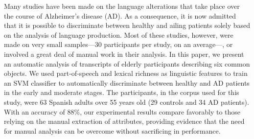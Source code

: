 Many studies have been made on the language alterations that take place over the course of Alzheimer's disease (AD). As a consequence, it is now admitted that it is possible to discriminate between healthy and ailing patients solely based on the analysis of language production. Most of these studies, however, were made on very small samples—30 participants per study, on an average—, or involved a great deal of manual work in their analysis. In this paper, we present an automatic analysis of transcripts of elderly participants describing six common objects. We used part-of-speech and lexical richness as linguistic features to train an SVM classifier to automatically discriminate between healthy and AD patients in the early and moderate stages. The participants, in the corpus used for this study, were 63 Spanish adults over 55 years old (29 controls and 34 AD patients). With an accuracy of 88\%, our experimental results compare favorably to those relying on the manual extraction of attributes, providing evidence that the need for manual analysis can be overcome without sacrificing in performance.
